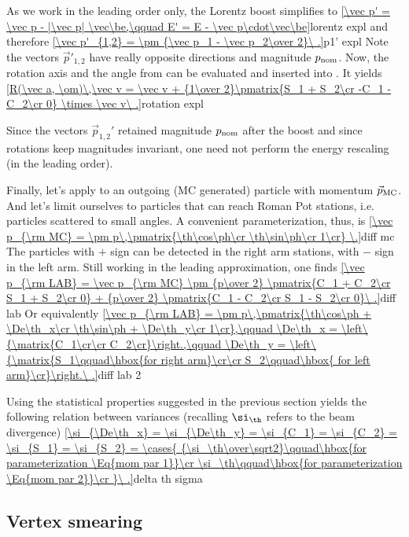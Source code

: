 As we work in the leading order only, the Lorentz boost  simplifies to
\eqref{\vec p' = \vec p - |\vec p| \vec\be,\qquad E' = E - \vec p\cdot\vec\be}{lorentz expl}
and therefore
\eqref{\vec p'_{1,2} = \pm {\vec p_1 - \vec p_2\over 2}\ .}{p1' expl}
Note the vectors $\vec p'_{1, 2}$ have really opposite directions and magnitude $p_{\rm nom}$. Now, the rotation axis and the angle from  can be evaluated and inserted into . It yields
\eqref{R(\vec a, \om)\,\vec v = \vec v + {1\over 2}\pmatrix{S_1 + S_2\cr -C_1 - C_2\cr 0} \times \vec v\ .}{rotation expl}

Since the vectors $\vec p_{1, 2}'$ retained magnitude $p_{\rm nom}$ after the boost and since rotations keep magnitudes invariant, one need not perform the energy rescaling (in the leading order).

Finally, let's apply  to an outgoing (MC generated) particle with momentum $\vec p_{\rm MC}$. And let's limit ourselves to particles that can reach Roman Pot stations, i.e. particles scattered to small angles. A convenient parameterization, thus, is
\eqref{\vec p_{\rm MC} = \pm p\,\pmatrix{\th\cos\ph\cr \th\sin\ph\cr 1\cr} \.}{diff mc}
The particles with $+$ sign can be detected in the right arm stations, with $-$ sign in the left arm. Still working in the leading approximation, one finds
\eqref{\vec p_{\rm LAB} = \vec p_{\rm MC} \pm {p\over 2} \pmatrix{C_1 + C_2\cr S_1 + S_2\cr 0} + {p\over 2} \pmatrix{C_1 - C_2\cr S_1 - S_2\cr 0}\ .}{diff lab}
Or equivalently
\eqref{\vec p_{\rm LAB} = \pm p\,\pmatrix{\th\cos\ph + \De\th_x\cr \th\sin\ph + \De\th_y\cr 1\cr},\qquad \De\th_x = \left\{\matrix{C_1\cr\cr C_2\cr}\right.,\qquad \De\th_y = \left\{\matrix{S_1\qquad\hbox{for right arm}\cr\cr S_2\qquad\hbox{ for left arm}\cr}\right.\ .}{diff lab 2} %

Using the statistical properties suggested in the previous section yields the following relation between variances (recalling $\si_\th$ refers to the beam divergence)
\eqref{\si_{\De\th_x} = \si_{\De\th_y} = \si_{C_1} = \si_{C_2} = \si_{S_1} = \si_{S_2} = \cases{
{\si_\th\over\sqrt2}\qquad\hbox{for parameterization \Eq{mom par 1}}\cr
\si_\th\qquad\hbox{for parameterization \Eq{mom par 2}}\cr
}\ .}{delta th sigma}


\subsection{Vertex smearing}

